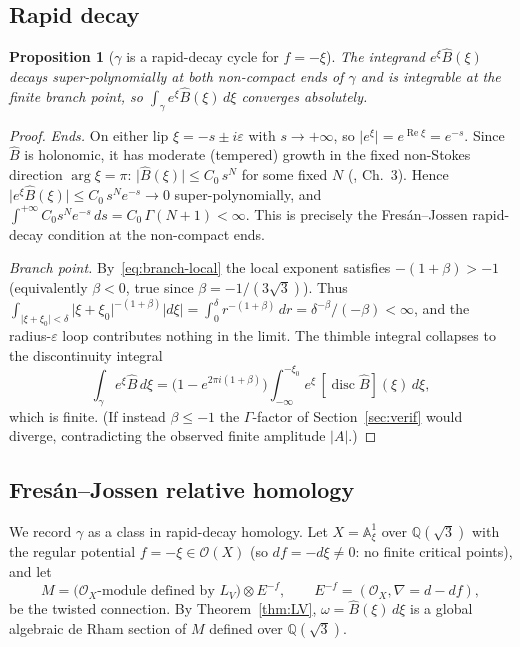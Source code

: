 \documentclass[11pt,reqno]{amsart}
\renewcommand{\_}{\vquadorigunderscore\allowbreak}
\theoremstyle{plain}
\newtheorem{proposition}[theorem]{Proposition}
\theoremstyle{definition}
\newcommand{\Bhat}{\widehat{B}}
\newcommand{\LV}{L_{V}}
\newcommand{\Qsqrt}{\mathbb{Q}(\sqrt3)}
\newcommand{\xizero}{\xi_0}
\begin{document}
\subsection{Rapid decay}
\begin{proposition}[$\gamma$ is a rapid-decay cycle for $f=-\xi$]\label{prop:rapiddecay}
The integrand $e^{\xi}\Bhat(\xi)$ decays super-polynomially at both non-compact ends of $\gamma$
and is integrable at the finite branch point, so $\int_\gamma e^{\xi}\Bhat(\xi)\,d\xi$ converges
absolutely.
\end{proposition}

\begin{proof}
\emph{Ends.} On either lip $\xi=-s\pm i\varepsilon$ with $s\to+\infty$, so
$\lvert e^{\xi}\rvert=e^{\operatorname{Re}\xi}=e^{-s}$. Since $\Bhat$ is holonomic, it has
moderate (tempered) growth in the fixed non-Stokes direction $\arg\xi=\pi$: $\lvert\Bhat(\xi)\rvert
\le C_0\,s^{N}$ for some fixed $N$ (\cite{vdPS}, Ch.~3). Hence
$\lvert e^{\xi}\Bhat(\xi)\rvert\le C_0\,s^{N}e^{-s}\to0$ super-polynomially, and
$\int^{+\infty}C_0 s^N e^{-s}\,ds=C_0\,\Gamma(N+1)<\infty$. This is precisely the Fres\'an--Jossen
rapid-decay condition at the non-compact ends.

\emph{Branch point.} By~\eqref{eq:branch-local} the local exponent satisfies $-(1+\beta)>-1$
(equivalently $\beta<0$, true since $\beta=-1/(3\sqrt3)$). Thus
$\int_{\lvert\xi+\xizero\rvert<\delta}\lvert\xi+\xizero\rvert^{-(1+\beta)}\lvert d\xi\rvert
=\int_0^\delta r^{-(1+\beta)}\,dr=\delta^{-\beta}/(-\beta)<\infty$, and the radius-$\varepsilon$
loop contributes nothing in the limit. The thimble integral collapses to the discontinuity
integral
\begin{equation}\label{eq:disc}
  \int_\gamma e^{\xi}\Bhat\,d\xi
  =\bigl(1-e^{2\pi i(1+\beta)}\bigr)\int_{-\infty}^{-\xizero}e^{\xi}\,[\operatorname{disc}\Bhat](\xi)\,d\xi,
\end{equation}
which is finite. (If instead $\beta\le-1$ the $\Gamma$-factor of Section~\ref{sec:verif} would
diverge, contradicting the observed finite amplitude $\lvert A\rvert$.)
\end{proof}

\subsection{Fres\'an--Jossen relative homology}
We record $\gamma$ as a class in rapid-decay homology. Let $X=\mathbb{A}^1_\xi$ over $\Qsqrt$ with
the regular potential $f=-\xi\in\mathcal{O}(X)$ (so $df=-d\xi\ne0$: no finite critical points), and
let
\begin{equation}\label{eq:Mmotive}
  M=\bigl(\mathcal{O}_X\text{-module defined by }\LV\bigr)\otimes E^{-f},\qquad
  E^{-f}=(\mathcal{O}_X,\nabla=d-df),
\end{equation}
be the twisted connection. By Theorem~\ref{thm:LV}, $\omega=\Bhat(\xi)\,d\xi$ is a global algebraic
de Rham section of $M$ defined over $\Qsqrt$.
\end{document}

